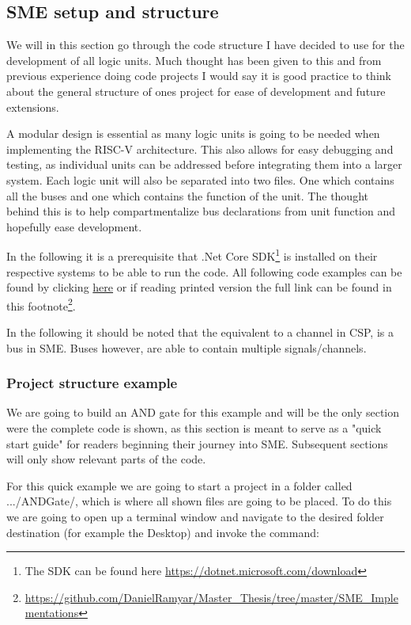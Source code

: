     \subsection{SME setup and structure}
        We will in this section go through the code structure I have decided to use for the development of all logic units. Much thought has been given to this and from previous experience doing code projects I would say it is good practice to think about the general structure of ones project for ease of development and future extensions.
        
        A modular design is essential as many logic units is going to be needed when implementing the RISC-V architecture. This also allows for easy debugging and testing, as individual units can be addressed before integrating them into a larger system. Each logic unit will also be separated into two files. One which contains all the buses and one which contains the function of the unit. The thought behind this is to help compartmentalize bus declarations from unit function and hopefully ease development.  
        
        In the following it is a prerequisite that .Net Core SDK\footnote{The SDK can be found here \url{https://dotnet.microsoft.com/download}} is installed on their respective systems to be able to run the code. All following code examples can be found by clicking \href{https://github.com/DanielRamyar/Master_Thesis/tree/master/SME_Implementations}{here} or if reading printed version the full link can be found in this footnote\footnote{\url{https://github.com/DanielRamyar/Master_Thesis/tree/master/SME_Implementations}}.
        
        In the following it should be noted that the equivalent to a channel in CSP, is a bus in SME. Buses however, are able to contain multiple signals/channels.  
        
        \subsubsection{Project structure example}
        We are going to build an AND gate for this example and will be the only section were the complete code is shown, as this section is meant to serve as a "quick start guide" for readers beginning their journey into SME. Subsequent sections will only show relevant parts of the code. 
        
        For this quick example we are going to start a project in a folder called .../ANDGate/, which is where all shown files are going to be placed.
        To do this we are going to open up a terminal window and navigate to the desired folder destination (for example the Desktop) and invoke the command: 
        

